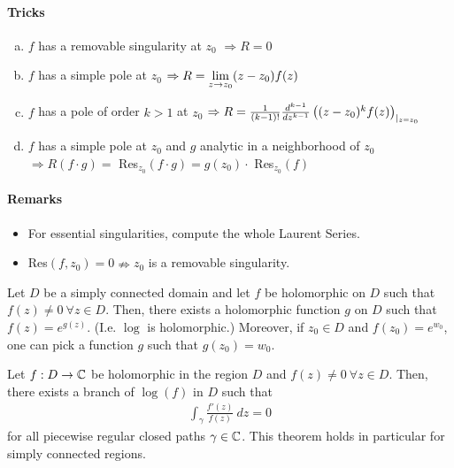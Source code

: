 \paragraph{Tricks}
\begin{enumerate}[a)]
    \item $f$ has a removable singularity at $z_0$ $\Rightarrow R = 0$
    \item $f$ has a simple pole at $z_0$ $\Rightarrow R = \lim\limits_{z \rightarrow z_0} (z-z_0) f(z)$
    \item $f$ has a pole of order $k>1$ at $z_0$ $\Rightarrow R = \frac{1}{(k-1)!} \frac{d^{k-1}}{dz^{k-1}} \left( (z-z_0)^k f(z) \right)_{|_{z=z_0}}$
    \item $f$ has a simple pole at $z_0$ and $g$ analytic in a neighborhood of $z_0$ $\Rightarrow R(f \cdot g) =$ Res$_{z_0} (f \cdot g) = g(z_0) \cdot$ Res$_{z_0} (f)$
\end{enumerate}

\paragraph{Remarks}
\begin{itemize}
    \item For essential singularities, compute the whole Laurent Series.
    \item Res$(f,z_0) = 0 \nRightarrow z_0$ is a removable singularity.
\end{itemize}

\begin{theorem}
    Let $D$ be a simply connected domain and let $f$ be holomorphic on $D$ such that
    $f(z) \neq 0 \ \forall z \in D$. Then, there exists a holomorphic function $g$
    on $D$ such that $f(z) = e^{g(z)}$. (I.e. $\log$ is holomorphic.) Moreover,
    if $z_0 \in D$ and $f(z_0) = e^{w_0}$, one can pick a function $g$ such that
    $g(z_0) = w_0$.
\end{theorem}

\begin{theorem}
    Let $f: D \rightarrow \mathbb{C}$ be holomorphic in the region $D$ and $f(z) \neq 0 \
    \forall z \in D$. Then, there exists a branch of $\log(f)$ in $D$ such that
    \begin{align*}
        \int_\gamma \frac{f'(z)}{f(z)} \ dz = 0
    \end{align*}
    for all piecewise regular closed paths $\gamma \in \mathbb{C}$.
    This theorem holds in particular for simply connected regions.
\end{theorem}


